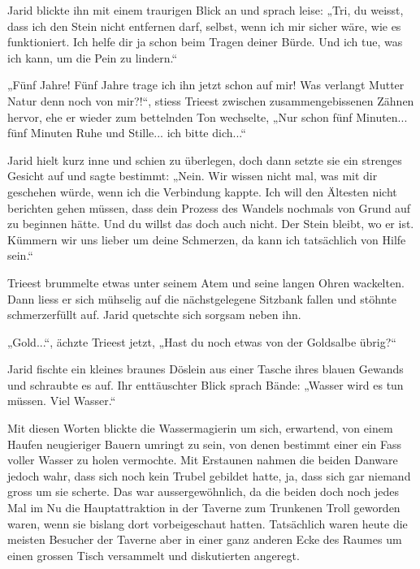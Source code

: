 Jarid blickte ihn mit einem traurigen Blick an und sprach leise: „Tri, du weisst, dass ich den Stein nicht entfernen darf, selbst, wenn ich mir sicher wäre, wie es funktioniert. Ich helfe dir ja schon beim Tragen deiner Bürde. Und ich tue, was ich kann, um die Pein zu lindern.“

„Fünf Jahre! Fünf Jahre trage ich ihn jetzt schon auf mir! Was verlangt Mutter Natur denn noch von mir?!“, stiess Trieest zwischen zusammengebissenen Zähnen hervor, ehe er wieder zum bettelnden Ton wechselte, „Nur schon fünf Minuten... fünf Minuten Ruhe und Stille... ich bitte dich...“

Jarid hielt kurz inne und schien zu überlegen, doch dann setzte sie ein strenges Gesicht auf und sagte bestimmt: „Nein. Wir wissen nicht mal, was mit dir geschehen würde, wenn ich die Verbindung kappte. Ich will den Ältesten nicht berichten gehen müssen, dass dein Prozess des Wandels nochmals von Grund auf zu beginnen hätte. Und du willst das doch auch nicht. Der Stein bleibt, wo er ist. Kümmern wir uns lieber um deine Schmerzen, da kann ich tatsächlich von Hilfe sein.“

Trieest brummelte etwas unter seinem Atem und seine langen Ohren wackelten. Dann liess er sich mühselig auf die nächstgelegene Sitzbank fallen und stöhnte schmerzerfüllt auf. Jarid quetschte sich sorgsam neben ihn.

„Gold...“, ächzte Trieest jetzt, „Hast du noch etwas von der Goldsalbe übrig?“

Jarid fischte ein kleines braunes Döslein aus einer Tasche ihres blauen Gewands und schraubte es auf. Ihr enttäuschter Blick sprach Bände: „Wasser wird es tun müssen. Viel Wasser.“

Mit diesen Worten blickte die Wassermagierin um sich, erwartend, von einem Haufen neugieriger Bauern umringt zu sein, von denen bestimmt einer ein Fass voller Wasser zu holen vermochte. Mit Erstaunen nahmen die beiden Danware jedoch wahr, dass sich noch kein Trubel gebildet hatte, ja, dass sich gar niemand gross um sie scherte. Das war aussergewöhnlich, da die beiden doch noch jedes Mal im Nu die Hauptattraktion in der Taverne zum Trunkenen Troll geworden waren, wenn sie bislang dort vorbeigeschaut hatten. Tatsächlich waren heute die meisten Besucher der Taverne aber in einer ganz anderen Ecke des Raumes um einen grossen Tisch versammelt und diskutierten angeregt.

